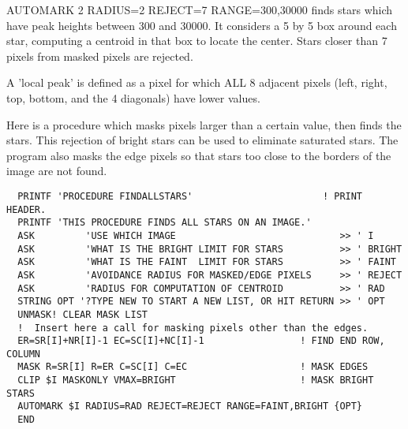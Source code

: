 \begin{example}
  \item[AUTOMARK 2 RADIUS=2 REJECT=7 RANGE=300,30000\hfill]{
finds stars which have peak heights between 300 and 30000.  It 
considers a 5 by 5 box around each star, computing a centroid
in that box to locate the center.  Stars closer than 7 pixels
from masked pixels are rejected.}
\end{example}
A 'local peak' is defined as a pixel for which ALL 8 adjacent pixels (left,
right, top, bottom, and the 4 diagonals) have lower values.

Here is a procedure which masks pixels larger than a certain value, then
finds the stars.  This rejection of bright stars can be used to eliminate
saturated stars.  The program also masks the edge pixels so that stars too
close to the borders of the image are not found.

\begin{verbatim}
  PRINTF 'PROCEDURE FINDALLSTARS'                       ! PRINT HEADER.
  PRINTF 'THIS PROCEDURE FINDS ALL STARS ON AN IMAGE.'
  ASK         'USE WHICH IMAGE                             >> ' I
  ASK         'WHAT IS THE BRIGHT LIMIT FOR STARS          >> ' BRIGHT
  ASK         'WHAT IS THE FAINT  LIMIT FOR STARS          >> ' FAINT
  ASK         'AVOIDANCE RADIUS FOR MASKED/EDGE PIXELS     >> ' REJECT
  ASK         'RADIUS FOR COMPUTATION OF CENTROID          >> ' RAD
  STRING OPT '?TYPE NEW TO START A NEW LIST, OR HIT RETURN >> ' OPT
  UNMASK! CLEAR MASK LIST
  !  Insert here a call for masking pixels other than the edges.
  ER=SR[I]+NR[I]-1 EC=SC[I]+NC[I]-1                 ! FIND END ROW, COLUMN
  MASK R=SR[I] R=ER C=SC[I] C=EC                    ! MASK EDGES
  CLIP $I MASKONLY VMAX=BRIGHT                      ! MASK BRIGHT STARS
  AUTOMARK $I RADIUS=RAD REJECT=REJECT RANGE=FAINT,BRIGHT {OPT}
  END
\end{verbatim}


